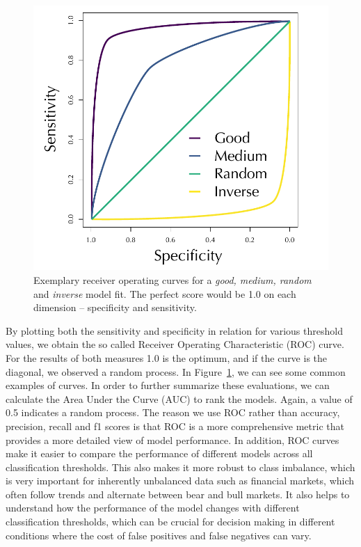 \documentclass[conference]{IEEEtran}
\begin{document}
\begin{figure}[h!]
    \centering
    \includegraphics[width=.85\linewidth]{pictures/ROC.pdf}
    \caption[ROC explanation]{Exemplary receiver operating curves for  a \textit{good, medium, random} and \textit{inverse} model fit. The perfect score would be 1.0 on each dimension -- specificity and sensitivity.}
    \label{fig:exroc}
    \end{figure}

By plotting both the sensitivity and specificity in relation for various threshold values, we obtain the so called Receiver Operating Characteristic (ROC) curve. For the results of both measures 1.0 is the optimum, and if the curve is the diagonal, we observed a random process.  In Figure~\ref{fig:exroc}, we can see some common examples of curves. In order to further summarize these evaluations, we can calculate the Area Under the Curve (AUC) to rank the models. Again, a value of 0.5 indicates a random process.
The reason we use ROC rather than accuracy, precision, recall and f1 scores is that ROC is a more comprehensive metric that provides a more detailed view of model performance. In addition, ROC curves make it easier to compare the performance of different models across all classification thresholds. This also makes it more robust to class imbalance, which is very important for inherently unbalanced data such as financial markets, which often follow trends and alternate between bear and bull markets. It also helps to understand how the performance of the model changes with different classification thresholds, which can be crucial for decision making in different conditions where the cost of false positives and false negatives can vary. \cite{Hastie2009}  \cite{Kauermann2021}  \cite{Russell2021}
\end{document}
